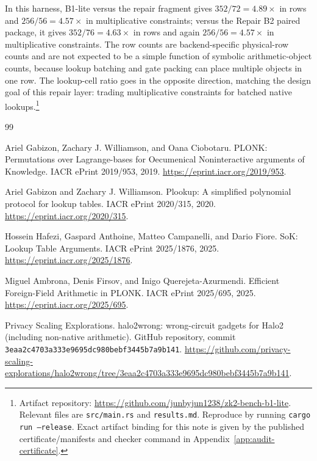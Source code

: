 ﻿\documentclass[11pt]{article}
\begin{document}
In this harness, B1-lite versus the repair fragment gives
\(352/72=4.89\times\) in rows and \(256/56=4.57\times\) in multiplicative
constraints; versus the Repair B2 paired package, it gives
\(352/76=4.63\times\) in rows and again \(256/56=4.57\times\) in multiplicative
constraints. The row counts are backend-specific physical-row counts and are
not expected to be a simple function of symbolic arithmetic-object counts,
because lookup batching and gate packing can place multiple objects in one row.
The lookup-cell ratio goes in the opposite direction, matching the design goal
of this repair layer: trading multiplicative constraints for batched native
lookups.\footnote{Artifact repository:
\url{https://github.com/junbyjun1238/zk2-bench-b1-lite}.
Relevant files are \texttt{src/main.rs} and \texttt{results.md}. Reproduce by
running \texttt{cargo run --release}. Exact artifact binding for this note is
given by the published certificate/manifests and checker command in
Appendix~\ref{app:audit-certificate}.}


\begin{thebibliography}{99}

Ariel Gabizon, Zachary J. Williamson, and Oana Ciobotaru.
\newblock PLONK: Permutations over Lagrange-bases for Oecumenical Noninteractive arguments of Knowledge.
\newblock IACR ePrint 2019/953, 2019.
\newblock \url{https://eprint.iacr.org/2019/953}.

Ariel Gabizon and Zachary J. Williamson.
\newblock Plookup: A simplified polynomial protocol for lookup tables.
\newblock IACR ePrint 2020/315, 2020.
\newblock \url{https://eprint.iacr.org/2020/315}.

Hossein Hafezi, Gaspard Anthoine, Matteo Campanelli, and Dario Fiore.
\newblock SoK: Lookup Table Arguments.
\newblock IACR ePrint 2025/1876, 2025.
\newblock \url{https://eprint.iacr.org/2025/1876}.

Miguel Ambrona, Denis Firsov, and Inigo Querejeta-Azurmendi.
\newblock Efficient Foreign-Field Arithmetic in PLONK.
\newblock IACR ePrint 2025/695, 2025.
\newblock \url{https://eprint.iacr.org/2025/695}.

Privacy Scaling Explorations.
\newblock halo2wrong: wrong-circuit gadgets for Halo2 (including non-native arithmetic).
\newblock GitHub repository, commit
\texttt{3eaa2c4703a333e9695dc980bebf3445b7a9b141}.
\newblock \url{https://github.com/privacy-scaling-explorations/halo2wrong/tree/3eaa2c4703a333e9695dc980bebf3445b7a9b141}.

\end{thebibliography}
\end{document}
